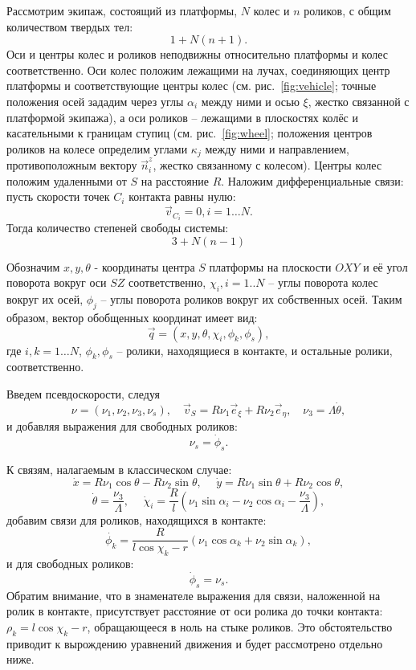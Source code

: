 Рассмотрим экипаж, состоящий из платформы, $N$ колес и $n$ роликов, с общим количеством твердых тел:
$$1 + N(n+1).$$
Оси и центры колес и роликов неподвижны относительно платформы и колес соответственно. Оси колес положим лежащими на лучах, соединяющих центр платформы и соответствующие центры колес (см. рис.~\ref{fig:vehicle}; точные положения осей зададим через углы $\alpha_i$ между ними и осью $\xi$, жестко связанной с платформой экипажа), а оси роликов -- лежащими в плоскостях колёс и касательными к границам ступиц (см. рис.~\ref{fig:wheel}; положения центров роликов на колесе определим углами $\kappa_j$ между ними и направлением, противоположным вектору $\vec{n}_i^z$, жестко связанному с колесом). Центры колес положим удаленными от $S$ на расстояние $R$. Наложим дифференциальные связи: пусть скорости точек $C_i$ контакта равны нулю:
$$\vec{v}_{C_i} = 0, i = 1\dots N.$$
Тогда количество степеней свободы системы:
$$3 + N(n-1)$$

Обозначим $x, y, \theta$ - координаты центра $S$ платформы на плоскости $OXY$ и её угол поворота вокруг оси $SZ$ соответственно, $\chi_i, i = 1..N$ -- углы поворота колес вокруг их осей, $\phi_j$ -- углы поворота роликов вокруг их собственных осей. Таким образом, вектор обобщенных координат имеет вид:
$$\vec{q} = (x, y, \theta, \chi_i, \phi_k, \phi_s),$$
где $i,k = 1\dots N$, $\phi_k, \phi_s$ -- ролики, находящиеся в контакте, и остальные ролики, соответственно.

Введем псевдоскорости, следуя \cite{Zobova2011}
$$\nu = (\nu_1, \nu_2, \nu_3, \nu_s), \quad \vec{v}_S = R\nu_1\vec{e}_\xi + R\nu_2\vec{e}_\eta, \quad \nu_3 = \Lambda\dot{\theta},$$
и добавляя выражения для свободных роликов:
$$\nu_s = \dot{\phi}_s.$$

К связям, налагаемым в классическом случае:
$$ \dot{x} = R \nu_1\cos\theta-R\nu_2\sin\theta, \hspace{15pt} \dot{y} = R\nu_1\sin\theta+R\nu_2\cos\theta,$$
$$\dot{\theta} = \frac{\nu_3}{\Lambda}, \hspace{15pt} \dot{\chi}_i = \frac{R}{l}(\nu_1\sin\alpha_i - \nu_2\cos\alpha_i - \frac{\nu_3}{\Lambda}),$$
добавим связи для роликов, находящихся в контакте:
$$ \dot{\phi_k} = \frac{R}{l\cos\chi_k-r}(\nu_1\cos\alpha_k + \nu_2\sin\alpha_k),$$
и для свободных роликов:
$$\dot{\phi}_s = \nu_s.$$
Обратим внимание, что в знаменателе выражения для связи, наложенной на ролик в контакте, присутствует расстояние от оси ролика до точки контакта: $\rho_k = l\cos\chi_k - r$, обращающееся в ноль на стыке роликов. Это обстоятельство приводит к вырождению уравнений движения и будет рассмотрено отдельно ниже.

